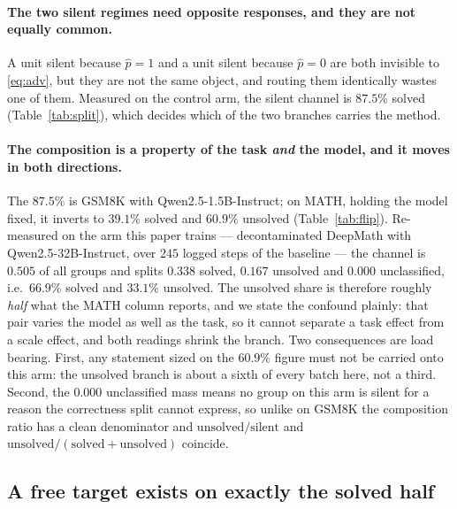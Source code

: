 \paragraph{The two silent regimes need opposite responses, and they are not equally
common.} A unit silent because $\hat p = 1$ and a unit silent because $\hat p = 0$ are both
invisible to \eqref{eq:adv}, but they are not the same object, and routing them identically
wastes one of them. Measured on the control arm, the silent channel is $87.5\%$ solved
(Table~\ref{tab:split}), which decides which of the two branches carries the method.

\paragraph{The composition is a property of the task \emph{and} the model, and it moves in both
directions.} The $87.5\%$ is GSM8K with Qwen2.5-1.5B-Instruct; on MATH, holding the model
fixed, it inverts to $39.1\%$ solved and $60.9\%$ unsolved (Table~\ref{tab:flip}). Re-measured
on the arm this paper trains --- decontaminated DeepMath with Qwen2.5-32B-Instruct, over $245$
logged steps of the baseline --- the channel is $0.505$ of all groups and splits $0.338$ solved,
$0.167$ unsolved and $0.000$ unclassified, i.e.\ $66.9\%$ solved and $33.1\%$ unsolved. The
unsolved share is therefore roughly \emph{half} what the MATH column reports, and we state the
confound plainly: that pair varies the model as well as the task, so it cannot separate a
task effect from a scale effect, and both readings shrink the branch. Two consequences are load
bearing. First, any statement sized on the $60.9\%$ figure must not be carried onto this arm:
the unsolved branch is about a sixth of every batch here, not a third. Second, the
$0.000$ unclassified mass means no group on this arm is silent for a reason the correctness
split cannot express, so unlike on GSM8K the composition ratio has a clean denominator and
$\text{unsolved}/\text{silent}$ and $\text{unsolved}/(\text{solved}+\text{unsolved})$ coincide.

\subsection{A free target exists on exactly the solved half}
\label{sec:selftarget}

